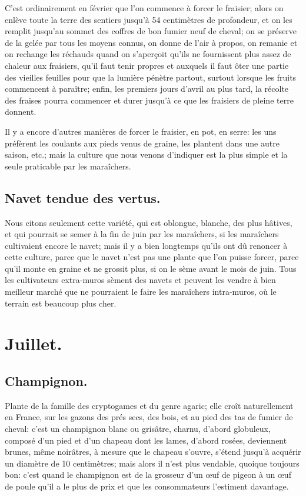 \documentclass[10pt,a4paper]{book}
\begin{document}
C'est ordinairement en février que l'on commence à forcer le fraisier; alors on enlève toute la terre des sentiers jusqu'à 54 centimètres de profondeur, et on les remplit jusqu'au sommet des coffres de bon fumier neuf de cheval; on se préserve de la gelée par tous les moyens connus, on donne de l'air à propos, on remanie et on rechange les réchauds quand on s'aperçoit qu'ils ne fournissent plus assez de chaleur aux fraisiers, qu'il faut tenir propres et auxquels il faut ôter une partie des vieilles feuilles pour que la lumière pénètre partout, surtout lorsque les fruits commencent à paraître; enfin, les premiers jours d'avril au plus tard, la récolte des fraises pourra commencer et durer jusqu'à ce que les fraisiers de pleine terre donnent.

Il y a encore d'autres manières de forcer le fraisier, en pot, en serre: les uns préfèrent les coulants aux pieds venus de graine, les plantent dans une autre saison, etc.; mais la culture que nous venons d'indiquer est la plus simple et la seule praticable par les maraîchers.

\subsection{Navet tendue des vertus.}

Nous citons seulement cette variété, qui est oblongue, blanche, des plus hâtives, et qui pourrait se semer à la fin de juin par les maraîchers, si les maraîchers cultivaient encore le navet; mais il y a bien longtemps qu'ils ont dû renoncer à cette culture, parce que le navet n'est pas une plante que l'on puisse forcer, parce qu'il monte en graine et ne grossit plus, si on le sème avant le mois de juin. Tous les cultivateurs extra-muros sèment des navets et peuvent les vendre à bien meilleur marché que ne pourraient le faire les maraîchers intra-muros, où le terrain est beaucoup plus cher.

\section{Juillet.}

\subsection{Champignon.}

Plante de la famille des cryptogames et du genre agaric; elle croît naturellement en France, sur les gazons des prés secs, des bois, et au pied des tas de fumier de cheval: c'est un champignon blanc ou grisâtre, charnu, d'abord globuleux, composé d'un pied et d'un chapeau dont les lames, d'abord rosées, deviennent brunes, même noirâtres, à mesure que le chapeau s'ouvre, s'étend jusqu'à acquérir un diamètre de 10 centimètres; mais alors il n'est plus vendable, quoique toujours bon: c'est quand le champignon est de la grosseur d'un œuf de pigeon à un œuf de poule qu'il a le plus de prix et que les consommateurs l'estiment davantage.
\end{document}
